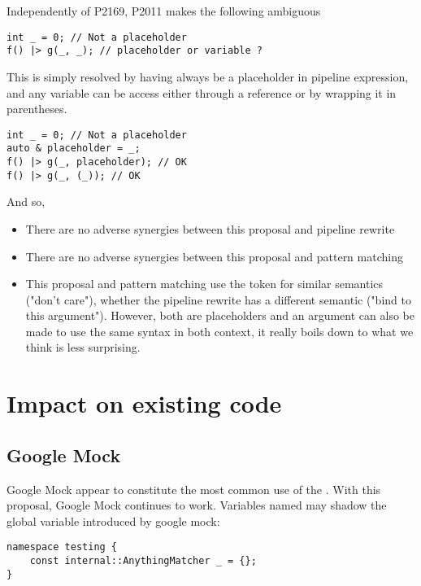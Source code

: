 \documentclass{wg21}
\begin{document}
{Independently of P2169, P2011 makes the following ambiguous

\begin{lstlisting}[style=color]
int _ = 0; // Not a placeholder
f() |> g(_, _); // placeholder or variable ?
\end{lstlisting}

This is simply resolved by having \tcode{_} always be a placeholder in pipeline expression,
and any \tcode{_} variable can be access either through a reference or by wrapping it in parentheses.

\begin{lstlisting}[style=color]
int _ = 0; // Not a placeholder
auto & placeholder = _;
f() |> g(_, placeholder); // OK
f() |> g(_, (_)); // OK
\end{lstlisting}


And so,

\begin{itemize}
\item There are no adverse synergies between this proposal and pipeline rewrite
\item There are no adverse synergies between this proposal and pattern matching
\item This proposal and pattern matching use the \tcode{_} token for similar semantics ("don't care"), whether the pipeline rewrite has a different semantic ("bind to this argument").
However, both are placeholders and an argument can also be made to use the same syntax in both context, it really boils down to what we think is less surprising.
\end{itemize}


\section{Impact on existing code}

\subsection{Google Mock}

Google Mock appear to constitute the most common use of the .
With this proposal, Google Mock continues to work.
Variables named \tcode{_} may shadow the  global variable introduced by google mock:

\begin{lstlisting}[style=color]
namespace testing {
    const internal::AnythingMatcher _ = {};
}
\end{lstlisting}

}
\end{document}
